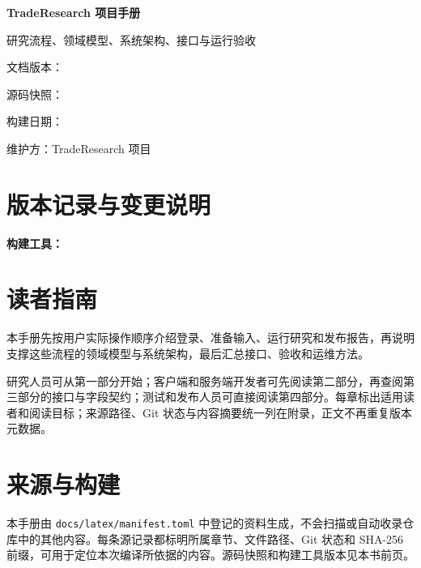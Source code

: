 \documentclass[UTF8,oneside,openany]{ctexbook}
\begin{document}
\frontmatter
\begin{titlepage}
  \centering
  \vspace*{30mm}
  {\Huge\bfseries TradeResearch 项目手册\par}
  \vspace{8mm}
  {\Large 研究流程、领域模型、系统架构、接口与运行验收\par}
  \vfill
  {\large 文档版本：\DocEdition\par}
  {\large 源码快照：\DocBuildRevision\par}
  {\large 构建日期：\DocBuildDate\par}
  {\large 维护方：TradeResearch 项目\par}
  \vspace{12mm}
\end{titlepage}
\chapter*{版本记录与变更说明}
\DocChangeSummary\par
\vspace{3mm}
\noindent\textbf{构建工具：} \DocToolchain
\chapter*{读者指南}
本手册先按用户实际操作顺序介绍登录、准备输入、运行研究和发布报告，再说明支撑这些流程的领域模型与系统架构，最后汇总接口、验收和运维方法。

研究人员可从第一部分开始；客户端和服务端开发者可先阅读第二部分，再查阅第三部分的接口与字段契约；测试和发布人员可直接阅读第四部分。每章标出适用读者和阅读目标；来源路径、Git 状态与内容摘要统一列在附录，正文不再重复版本元数据。
\tableofcontents
\mainmatter

\appendix
\chapter{来源与构建}
本手册由 \texttt{docs/latex/manifest.toml} 中登记的资料生成，不会扫描或自动收录仓库中的其他内容。每条源记录都标明所属章节、文件路径、Git 状态和 SHA-256 前缀，可用于定位本次编译所依据的内容。源码快照和构建工具版本见本书前页。


\end{document}
